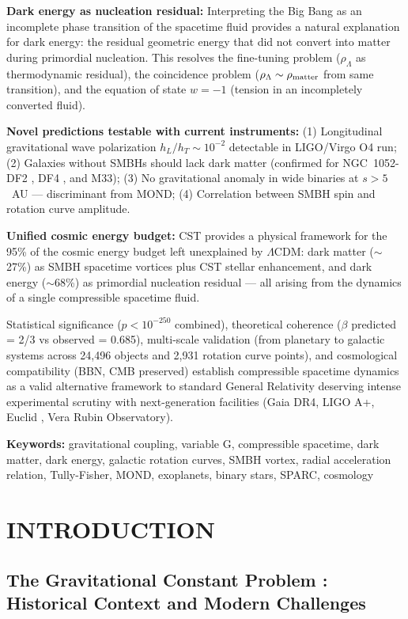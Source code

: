 \documentclass[11pt,a4paper]{article}
\begin{document}
\textbf{Dark energy as nucleation residual:} Interpreting the Big Bang as an incomplete phase transition of the spacetime fluid provides a natural explanation for dark energy: the residual geometric energy that did not convert into matter during primordial nucleation. This resolves the fine-tuning problem ($\rho_\Lambda$ as thermodynamic residual), the coincidence problem ($\rho_\Lambda \sim \rho_{\rm matter}$ from same transition), and the equation of state $w = -1$ (tension in an incompletely converted fluid).

\textbf{Novel predictions testable with current instruments:} (1)
Longitudinal gravitational wave polarization \(h_L/h_T \sim 10^{-2}\)
detectable in LIGO/Virgo O4 run; (2) Galaxies without SMBHs should lack dark matter (confirmed for NGC~1052-DF2 \cite{vanDokkum2018}, DF4 \cite{vanDokkum2019}, and M33); (3) No gravitational anomaly in wide binaries at $s > 5$~AU --- discriminant from MOND; (4) Correlation between SMBH spin and rotation curve amplitude.

\textbf{Unified cosmic energy budget:} CST provides a physical framework for the 95\% of the cosmic energy budget left unexplained by $\Lambda$CDM: dark matter ($\sim$27\%) as SMBH spacetime vortices plus CST stellar enhancement, and dark energy ($\sim$68\%) as primordial nucleation residual --- all arising from the dynamics of a single compressible spacetime fluid.

Statistical significance (\(p < 10^{-250}\) combined), theoretical
coherence (\(\beta\) predicted = 2/3 vs observed = 0.685), multi-scale
validation (from planetary to galactic systems across 24,496 objects and
2,931 rotation curve points), and cosmological
compatibility (BBN, CMB preserved) establish compressible spacetime
dynamics as a valid alternative framework to standard General Relativity
deserving intense experimental scrutiny with next-generation facilities
(Gaia DR4, LIGO A+, Euclid \cite{ref17}, Vera Rubin Observatory).

\textbf{Keywords:} gravitational coupling, variable G, compressible
spacetime, dark matter, dark energy, galactic rotation curves, SMBH vortex,
radial acceleration relation, Tully-Fisher, MOND, exoplanets, binary stars,
SPARC, cosmology

\hypertarget{introduction}{%
\section{INTRODUCTION}\label{introduction}}

\hypertarget{the-gravitational-constant-problem-historical-context-and-modern-challenges}{%
\subsection{The Gravitational Constant Problem \cite{Uzan2011}: Historical
Context and Modern
Challenges}\label{the-gravitational-constant-problem-historical-context-and-modern-challenges}}
\end{document}
